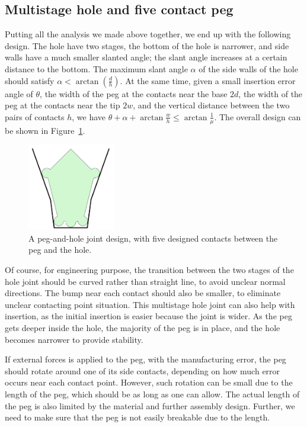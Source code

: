 \documentclass[11pt, twocolumn]{article}
\begin{document}
\subsection{Multistage hole and five contact peg}

Putting all the analysis we made above together, we end up with the following design. The hole have two stages, the bottom of the hole is narrower, and side walls have a much smaller slanted angle; the slant angle increases at a certain distance to the bottom. The maximum slant angle $\alpha$ of the side walls of the hole should satisfy $\alpha < \arctan(\frac{d}{h})$. At the same time, given a small insertion error angle of $\theta$, the width of the peg at the contacts near the base $2d$, the width of the peg at the contacts near the tip $2w$, and the vertical distance between the two pairs of contacts $h$, we have $\theta+\alpha+\arctan{\frac{w}{h}} \leq \arctan{\frac{1}{\mu}}$. The overall design can be shown in Figure~\ref{fig:five_contact}. 


\begin{figure}
\begin{center}
\includegraphics[width=1.5in]{figures/five_contact.png}
\end{center}
\caption{A peg-and-hole joint design, with five designed contacts between the peg and the hole. }
\label{fig:five_contact}
\end{figure}

Of course, for engineering purpose, the transition between the two stages of the hole joint should be curved rather than straight line, to avoid unclear normal directions. The bump near each contact should also be smaller, to eliminate unclear contacting point situation. This multistage hole joint can also help with insertion, as the initial insertion is easier because the joint is wider. As the peg gets deeper inside the hole, the majority of the peg is in place, and the hole becomes narrower to provide stability. 

If external forces is applied to the peg, with the manufacturing error, the peg should rotate around one of its side contacts, depending on how much error occurs near each contact point. However, such rotation can be small due to the length of the peg, which should be as long as one can allow. The actual length of the peg is also limited by the material and further assembly design. Further, we need to make sure that the peg is not easily breakable due to the length. 
\end{document}
